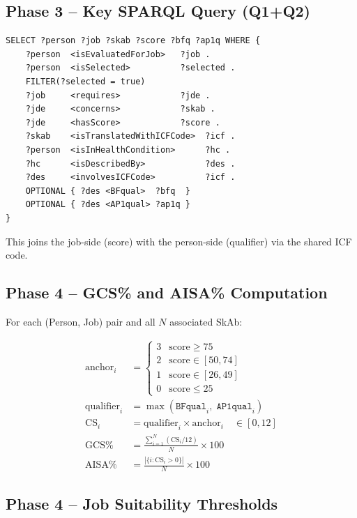 ﻿\documentclass[12pt,a4paper]{article}
\begin{document}
\subsection{Phase 3 -- Key SPARQL Query (Q1+Q2)}

\begin{lstlisting}[language=SPARQL]
SELECT ?person ?job ?skab ?score ?bfq ?ap1q WHERE {
    ?person  <isEvaluatedForJob>   ?job .
    ?person  <isSelected>          ?selected .
    FILTER(?selected = true)
    ?job     <requires>            ?jde .
    ?jde     <concerns>            ?skab .
    ?jde     <hasScore>            ?score .
    ?skab    <isTranslatedWithICFCode>  ?icf .
    ?person  <isInHealthCondition>      ?hc .
    ?hc      <isDescribedBy>            ?des .
    ?des     <involvesICFCode>          ?icf .
    OPTIONAL { ?des <BFqual>  ?bfq  }
    OPTIONAL { ?des <AP1qual> ?ap1q }
}
\end{lstlisting}

This joins the job-side (score) with the person-side (qualifier) via the shared ICF code.

\subsection{Phase 4 -- GCS\% and AISA\% Computation}

For each (Person, Job) pair and all $N$ associated SkAb:

\begin{align}
  \text{anchor}_i &= \begin{cases} 3 & \text{score} \geq 75 \\ 2 & \text{score} \in [50, 74] \\ 1 & \text{score} \in [26, 49] \\ 0 & \text{score} \leq 25 \end{cases} \\[6pt]
  \text{qualifier}_i &= \max(\texttt{BFqual}_i,\; \texttt{AP1qual}_i) \\[6pt]
  \text{CS}_i &= \text{qualifier}_i \times \text{anchor}_i \quad \in [0, 12] \\[6pt]
  \text{GCS\%} &= \frac{\sum_{i=1}^{N} \left(\text{CS}_i / 12\right)}{N} \times 100 \\[6pt]
  \text{AISA\%} &= \frac{|\{i : \text{CS}_i > 0\}|}{N} \times 100
\end{align}

\subsection{Phase 4 -- Job Suitability Thresholds}
\end{document}

